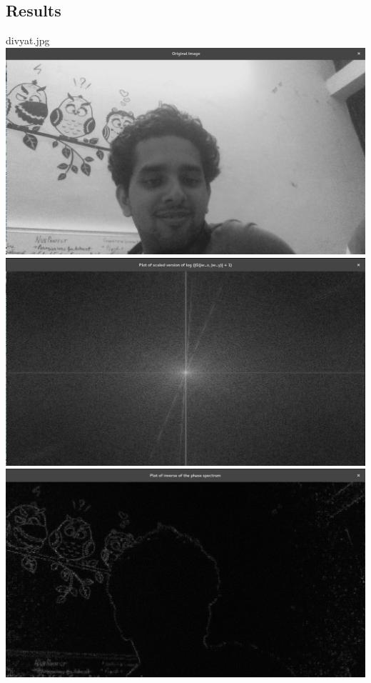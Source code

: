 \documentclass[a4paper,fleqn,11pt]{article}
\theoremstyle{mytheor}
\begin{document}
\subsection*{Results}
\begin{center}
divyat.jpg \\
\includegraphics[scale= 0.25]{../results/divyat.png}
\includegraphics[scale= 0.25]{../results/divyat_spectrum.png}
\includegraphics[scale= 0.25]{../results/divyat_phase.png}

\end{center}
\end{document}
